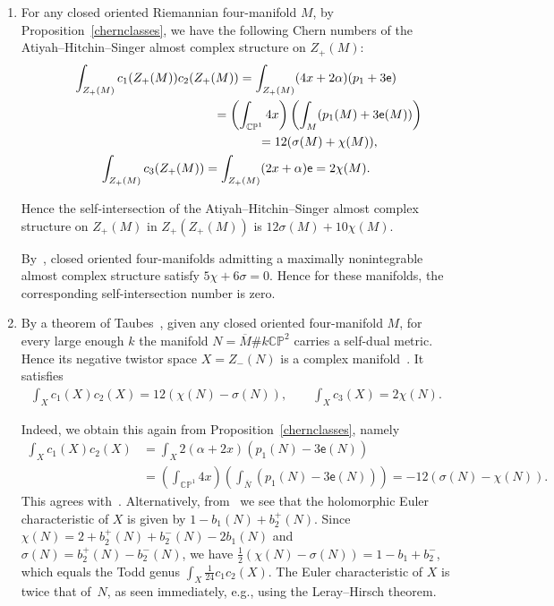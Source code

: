 \documentclass[pdftex]{sigma}%
\newcommand{\CP}{\mathbb{CP}}
\numberwithin{equation}{section}
\begin{document}
\begin{Example}\label{intersectiontwistor4d} \quad\samepage
\begin{enumerate}\itemsep=0pt \item
For any closed oriented Riemannian four-manifold $M$, by Proposition~\ref{chernclasses}, we have the following Chern numbers of the Atiyah--Hitchin--Singer almost complex structure on $Z_+(M)$:
\begin{gather*}
\int_{Z_+(M)} c_1(Z_+(M))c_2(Z_+(M)) = \int_{Z_+(M)} (4x+2\alpha)(p_1+3\mathsf{e}) \\
\hphantom{\int_{Z_+(M)} c_1(Z_+(M))c_2(Z_+(M))}{}
= \left( \int_{\CP^1}4x \right)\left( \int_{M} (p_1(M)+3\mathsf{e}(M)) \right) \\
\hphantom{\int_{Z_+(M)} c_1(Z_+(M))c_2(Z_+(M))}{}
 = 12(\sigma(M)+\chi(M)), \\
\int_{Z_+(M)} c_3(Z_+(M)) = \int_{Z_+(M)} (2x+\alpha)\mathsf{e} = 2 \chi(M).
\end{gather*}

Hence the self-intersection of the Atiyah--Hitchin--Singer almost complex structure on $Z_+(M)$ in $Z_+(Z_+(M))$ is $12\sigma(M) + 10\chi(M)$.

By~\cite[Lemma~3]{Ar97}, closed oriented four-manifolds admitting a maximally nonintegrable almost complex structure satisfy $5\chi + 6\sigma = 0$. Hence for these manifolds, the corresponding self-intersection number is zero.

\item By a theorem of Taubes~\cite[Theorem~1.1]{T92}, given any closed oriented four-manifold $M$, for every large enough $k$ the manifold $N = \overline{M} \# k \CP^2$ carries a self-dual metric. Hence its negative twistor space $X = Z_-(N)$ is a complex manifold~\cite[Theorem~4.1]{AHS78}. It satisfies \begin{align*} \int_X c_1(X)c_2(X) = 12(\chi(N) - \sigma(N)), \qquad \int_X c_3(X) = 2\chi(N).\end{align*}

Indeed, we obtain this again from Proposition~\ref{chernclasses}, namely \begin{align*} \int_X c_1(X)c_2(X) &= \int_X 2(\alpha +2x)(p_1(N)-3\mathsf{e}(N)) \\ &= \left( \int_{\CP^1}4x \right) \left( \int_{\overline{N}} (p_1(N)-3\mathsf{e}(N)) \right) = -12(\sigma(N)-\chi(N)).\end{align*} This agrees with~\cite[equation~(1.5)]{Hi81}. Alternatively, from~\cite[Section~4]{EaSi93} we see that the holomorphic Euler characteristic of $X$ is given by $1 - b_1(N) + b_2^+(N)$. Since $\chi(N) = 2+b_2^+(N) +b_2^-(N) - 2b_1(N)$ and $\sigma(N) = b_2^+(N) - b_2^-(N)$, we have $\tfrac{1}{2}(\chi(N) - \sigma(N)) = 1 - b_1+b_2^-$, which equals the Todd genus $\int_X \tfrac{1}{24}c_1c_2(X)$. The Euler characteristic of $X$ is twice that of~$N$, as seen immediately, e.g., using the Leray--Hirsch theorem.


\end{enumerate}
\end{Example}
\end{document}
